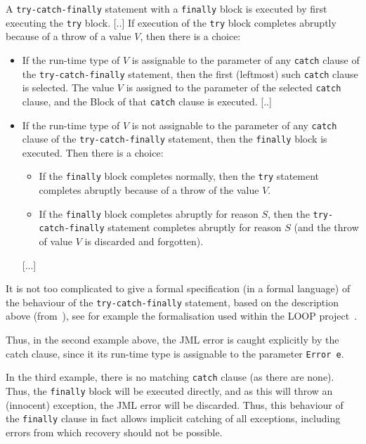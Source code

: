 \documentclass[]{llncs}
\begin{document}
A \texttt{try-catch-finally} statement with a \texttt{finally} block
is executed by first executing the \texttt{try} block. [..]  If
execution of the \texttt{try} block completes abruptly because of a
throw of a value \(V\), then there is a choice:
\begin{itemize}
\item If the run-time type of \(V\) is assignable to the parameter of
any \texttt{catch} clause of the \texttt{try-catch-finally} statement,
then the first (leftmost) such \texttt{catch} clause is selected. The
value \(V\) is assigned to the parameter of the selected
\texttt{catch} clause, and the Block of that \texttt{catch} clause is
executed. [..]

\item If the run-time type of \(V\) is not assignable to the parameter
of any \texttt{catch} clause of the \texttt{try-catch-finally}
statement, then the \texttt{finally} block is executed. Then there is
a choice:

\begin{itemize}
\item If the \texttt{finally} block completes normally, then the \texttt{try}
statement completes abruptly because of a throw of the value \(V\).
\item If the \texttt{finally} block completes abruptly for reason
\(S\), then the \texttt{try-catch-finally} statement completes
abruptly for reason \(S\) (and the throw of value \(V\) is discarded
and forgotten).
\end{itemize} 
[...]
\end{itemize}

It is not too complicated to give a formal specification (in a formal
language) of the behaviour of the \texttt{try-catch-finally}
statement, based on the description above (from~\cite{GoslingJSB05}),
see for example the formalisation used within the LOOP
project~\cite{Jacobs01}. 

Thus, in the second example above, the JML error is caught explicitly
by the catch clause, since it its run-time type is assignable to the
parameter \texttt{Error e}.

In the third example, there is no matching \texttt{catch} clause (as
there are none). Thus, the \texttt{finally} block will be executed
directly, and as this will throw an (innocent) exception, the JML
error will be discarded. Thus, this behaviour of the \texttt{finally}
clause in fact allows implicit catching of all exceptions, including
errors from which recovery should not be possible.
\end{document}
